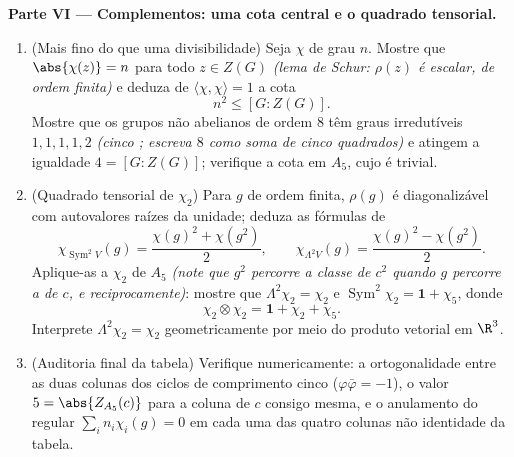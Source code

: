 \begin{problem}
\medskip
\noindent\textbf{Parte VI --- Complementos: uma cota central e o
quadrado tensorial.}
\begin{enumerate}[resume]
  \item (Mais fino do que uma divisibilidade) Seja $\chi$
         de grau $n$. Mostre que $\abs{\chi(z)} = n$ para todo $z \in Z(G)$
        \emph{(lema de Schur: $\rho(z)$ é escalar, de ordem finita)} e
        deduza de $\langle\chi, \chi\rangle = 1$ a cota
        \[
        n^2 \leq [G : Z(G)] .
        \]
        Mostre que os grupos não abelianos de ordem $8$ têm graus
        irredutíveis $1, 1, 1, 1, 2$ \emph{(cinco ; escreva
        $8$ como soma de cinco quadrados)} e atingem a igualdade
        $4 = [G : Z(G)]$; verifique a cota em $A_5$, cujo  é trivial.
  \item (Quadrado tensorial de $\chi_2$) Para $g$ de ordem
        finita, $\rho(g)$ é diagonalizável com autovalores raízes da
        unidade; deduza as fórmulas de 
        \[
        \chi_{\operatorname{Sym}^2 V}(g)
        = \frac{\chi(g)^2 + \chi(g^2)}2,
        \qquad
        \chi_{\Lambda^2 V}(g)
        = \frac{\chi(g)^2 - \chi(g^2)}2 .
        \]
        Aplique-as a $\chi_2$ de $A_5$ \emph{(note que $g^2$
        percorre a classe de $c^2$ quando $g$ percorre a de
        $c$, e reciprocamente)}: mostre que $\Lambda^2\chi_2 =
        \chi_2$ e $\operatorname{Sym}^2\chi_2 = \mathbf 1 +
        \chi_5$, donde
        \[
        \chi_2\otimes\chi_2 = \mathbf 1 + \chi_2 + \chi_5 .
        \]
        Interprete $\Lambda^2\chi_2 = \chi_2$ geometricamente por meio do produto vetorial
        em $\R^3$.
  \item (Auditoria final da tabela) Verifique numericamente: a
        ortogonalidade entre as duas colunas dos ciclos de comprimento
        cinco ($\varphi\bar\varphi = -1$), o valor $5 =
        \abs{Z_{A_5}(c)}$ para a coluna de $c$ consigo
        mesma, e o anulamento do  regular $\sum_i
        n_i\chi_i(g) = 0$ em cada uma das
        quatro colunas não identidade da tabela.
\end{enumerate}
\end{problem}
